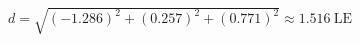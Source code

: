 \documentclass[preview]{standalone}
\begin{document}
\begin{center}
$d = \sqrt{(-1.286)^2 + (0.257)^2 + (0.771)^2} \approx 1.516 \mathrm{\: LE}$
\end{center}
\end{document}
